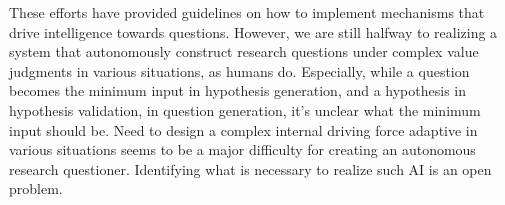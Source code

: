 These efforts have provided guidelines on how to implement mechanisms that drive intelligence towards questions. However, we are still halfway to realizing a system that autonomously construct research questions under complex value judgments in various situations, as humans do. Especially, while a question becomes the minimum input in hypothesis generation, and a hypothesis in hypothesis validation, in question generation, it's unclear what the minimum input should be. Need to design a complex internal driving force adaptive in various situations seems to be a major difficulty for creating an autonomous research questioner. Identifying what is necessary to realize such AI is an open problem.



